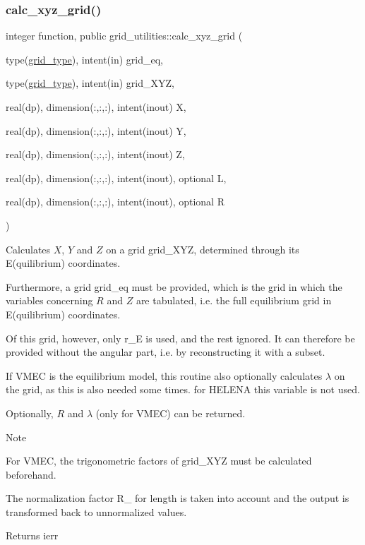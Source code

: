 \subsubsection{\texorpdfstring{calc\+\_\+xyz\+\_\+grid()}{calc\_xyz\_grid()}}
{\footnotesize\ttfamily integer function, public grid\+\_\+utilities\+::calc\+\_\+xyz\+\_\+grid (\begin{DoxyParamCaption}\item[{type(\hyperlink{structgrid__vars_1_1grid__type}{grid\+\_\+type}), intent(in)}]{grid\+\_\+eq,  }\item[{type(\hyperlink{structgrid__vars_1_1grid__type}{grid\+\_\+type}), intent(in)}]{grid\+\_\+\+X\+YZ,  }\item[{real(dp), dimension(\+:,\+:,\+:), intent(inout)}]{X,  }\item[{real(dp), dimension(\+:,\+:,\+:), intent(inout)}]{Y,  }\item[{real(dp), dimension(\+:,\+:,\+:), intent(inout)}]{Z,  }\item[{real(dp), dimension(\+:,\+:,\+:), intent(inout), optional}]{L,  }\item[{real(dp), dimension(\+:,\+:,\+:), intent(inout), optional}]{R }\end{DoxyParamCaption})}



Calculates $X$, $Y$ and $Z$ on a grid {\ttfamily grid\+\_\+\+X\+YZ}, determined through its E(quilibrium) coordinates. 

Furthermore, a grid {\ttfamily grid\+\_\+eq} must be provided, which is the grid in which the variables concerning $R$ and $Z$ are tabulated, i.\+e. the full equilibrium grid in E(quilibrium) coordinates.

Of this grid, however, only {\ttfamily r\+\_\+E} is used, and the rest ignored. It can therefore be provided without the angular part, i.\+e. by reconstructing it with a subset.

If V\+M\+EC is the equilibrium model, this routine also optionally calculates $\lambda$ on the grid, as this is also needed some times. for H\+E\+L\+E\+NA this variable is not used.

Optionally, $R$ and $\lambda$ (only for V\+M\+EC) can be returned.

\begin{DoxyNote}{Note}

\begin{DoxyEnumerate}
\item For V\+M\+EC, the trigonometric factors of {\ttfamily grid\+\_\+\+X\+YZ} must be calculated beforehand.
\item The normalization factor {\ttfamily R\+\_} for length is taken into account and the output is transformed back to unnormalized values.
\end{DoxyEnumerate}
\end{DoxyNote}
\begin{DoxyReturn}{Returns}
ierr
\end{DoxyReturn}

